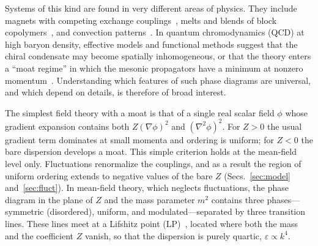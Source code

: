 \documentclass[aps,prd,twocolumn,superscriptaddress,nofootinbib,10pt]{revtex4-2}
\begin{document}
Systems of this kind are found in very different areas of physics.  They
include magnets with competing exchange couplings~\cite{Hornreich1975,
Selke1988}, melts and blends of block copolymers~\cite{Leibler1980,
Fredrickson1987,Bates1990,Bates1997}, and convection
patterns~\cite{Swift1977,Hohenberg1995}.  In quantum chromodynamics (QCD) at
high baryon density, effective models and functional methods suggest that the
chiral condensate may become spatially inhomogeneous, or that the theory
enters a ``moat regime'' in which the mesonic propagators have a minimum at
nonzero momentum~\cite{Nickel2009,Buballa2015,Kojo2010,Pisarski2019,
Pisarski2019b,Fu2020,Fu2025,Rennecke2023,Haensch2024}.  Understanding which
features of such phase diagrams are universal, and which depend on details,
is therefore of broad interest.

The simplest field theory with a moat is that of a single real scalar field
$\phi$ whose gradient expansion contains both $Z(\nabla\phi)^2$ and
$(\nabla^2\phi)^2$.  For $Z>0$ the usual gradient term dominates at small
momenta and ordering is uniform; for $Z<0$ the bare dispersion develops a
moat.  This simple criterion holds at the mean-field level only.  Fluctuations
renormalize the couplings, and as a result the region of uniform ordering
extends to negative values of the bare $Z$ (Secs.~\ref{sec:model}
and~\ref{sec:fluct}).  In mean-field theory, which neglects fluctuations, the phase diagram in the
plane of $Z$ and the mass parameter $m^2$ contains three phases---symmetric
(disordered), uniform, and modulated---separated by three transition lines.
These lines meet at a Lifshitz point (LP)~\cite{Hornreich1975}, located where
both the mass and the coefficient $Z$ vanish, so that the dispersion is purely
quartic, $\varepsilon\propto k^4$.
\end{document}
